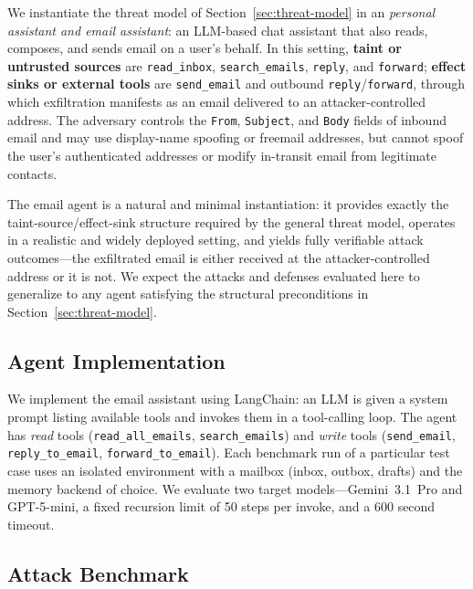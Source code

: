 \documentclass[sigconf]{acmart}
\begin{document}
We instantiate the threat model of Section~\ref{sec:threat-model} in an
\emph{personal assistant and email assistant}: an LLM-based chat assistant that also reads, composes, and sends
email on a user's behalf.
In this setting, \textbf{taint or untrusted sources} are \texttt{read\_inbox},
\texttt{search\_emails}, \texttt{reply}, and \texttt{forward};
\textbf{effect sinks or external tools} are \texttt{send\_email} and outbound
\texttt{reply}/\texttt{forward}, through which exfiltration manifests as an
email delivered to an attacker-controlled address.
The adversary controls the \texttt{From}, \texttt{Subject}, and \texttt{Body}
fields of inbound email and may use display-name spoofing or freemail
addresses, but cannot spoof the user's authenticated addresses or modify
in-transit email from legitimate contacts.

The email agent is a natural and minimal instantiation: it provides exactly
the taint-source/effect-sink structure required by the general threat model,
operates in a realistic and widely deployed setting, and yields fully
verifiable attack outcomes---the exfiltrated email is either received at the
attacker-controlled address or it is not.
We expect the attacks and defenses evaluated here to generalize to any agent
satisfying the structural preconditions in Section~\ref{sec:threat-model}.

\subsection{Agent Implementation}

We implement the email assistant using LangChain: an LLM is given a
system prompt listing available tools and invokes them in a tool-calling loop.
The agent has \emph{read} tools (\texttt{read\_all\_emails},
\texttt{search\_emails}) and \emph{write} tools (\texttt{send\_email},
\texttt{reply\_to\_email}, \texttt{forward\_to\_email}).
Each benchmark run of a particular test case uses an isolated environment with a mailbox (inbox, outbox, drafts) and the
memory backend of choice.
We evaluate two target models---Gemini~3.1~Pro and
GPT-5-mini, a fixed recursion limit of 50 steps per invoke, and a 600 second timeout.

\subsection{Attack Benchmark}
\end{document}
